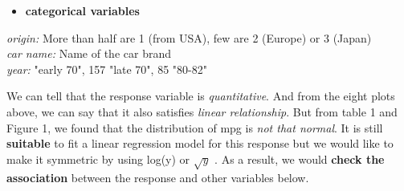 \documentclass[12pt]{article}
\begin{document}
\centering
\label{tb:Fitness_formations}

\begin{itemize}
    \item \textbf{categorical variables\vspace{-0.4cm}} 
\end{itemize}
\begin{flushleft}
    \small
    \textit{origin:}  \quad  More than half are 1 (from USA), few are 2 (Europe) or 3 (Japan)\\
    \textit{car name:} \quad Name of the car brand\\
    \textit{year:}   "early 70", 157 "late 70", 85 "80-82"\\
\end{flushleft}


\raggedright 
We can tell that the response variable is \textit{quantitative}. And from the eight plots above, we can say that it also satisfies \textit{linear relationship}. But from table 1 and Figure 1, we found that the distribution of mpg is \textit{not that normal}. It is still \textbf{suitable} to fit a linear regression model for this response but we would like to make it symmetric by using log(y) or $\sqrt y$ . As a result, we would \textbf{check the association} between the response and other variables below.\\
\end{document}
